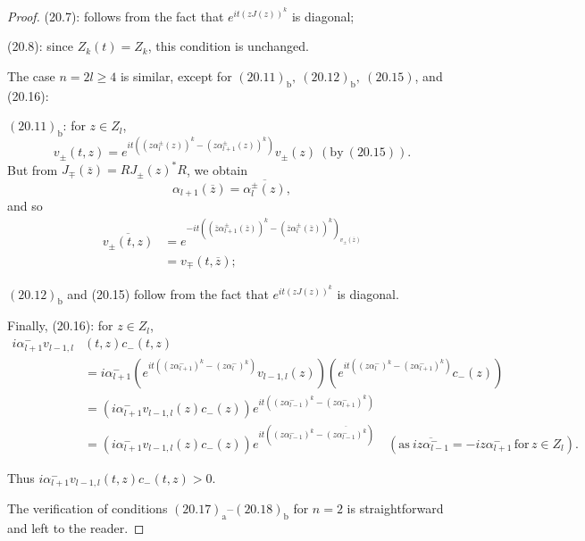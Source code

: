 \documentclass{surv-l}
\theoremstyle{plain}
\theoremstyle{definition}
\numberwithin{equation}{chapter}
\begin{document}
\begin{proof}
(20.7): follows from the fact that $e^{it(zJ(z))^{k}}$ is diagonal;

(20.8): since $Z_{k}(t)=Z_{k}$, this condition is unchanged.

The case $n=2l\geq 4$ is similar, except for $(20.11)_{\mathrm{b}},\ (20.12)_{\mathrm{b}},\ (20.15)$, and (20.16):

$(20.11)_{\mathrm{b}}$: for $z\in Z_{l}$,
\begin{equation*}
v_{\pm}(t, z)=e^{it{((z\alpha_{l}^{\pm}(z))^{k}-(z\alpha_{l+1}^{\pm}(z))^{k})}}{v_\pm}(z)\ (\mathrm{by}\ (20.15)).
\end{equation*}
But from $J_{\mp}(\overline{z})=RJ_{\pm}(z)^{*}R$, we obtain
\begin{equation*}
\alpha_{l+1}(\overline{z})=\overline{\alpha_{l}^{\pm}(z)},
\end{equation*}
and so
\begin{align*}
\overline{v_{\pm}(t,z)}&=e^{-it(({\overline{z}\alpha}_{l+1}^{\pm}(\overline{z}))^{k}-({\overline{z}\alpha}_{l}^{\pm}
(\overline{z}))^{k})_{v_{\pm}(\overline{z})}}\\
&=v_{\mp}(t,\overline{z});
\end{align*}

$(20.12)_{\mathrm{b}}$ and (20.15) follow from the fact that $e^{it(zJ(z))^{k}}$ is diagonal.

Finally, (20.16): for $z\in Z_{l}$,
\begin{align*}
i\alpha_{l+1}^{-}v_{l-1,l}&(t, z)c_{-}(t, z)\\
&=i\alpha_{l+1}^{-}(e^{it((z\alpha_{l+1}^{-})^{k}-(z\alpha_{l}^{-})^{k})}v_{l-1,l}(z))(e^{it((z\alpha_{l}^{-})^{k}-(z\alpha_{l+1}^{-})^{k})}{c_{-}(z)})\\
&=(i\alpha_{l+1}^{-}v_{l-1,l}(z)c_{-}(z))e^{it( (z\alpha_{l-1}^{-})^{k}-(z\alpha_{l+1}^{-})^{k})}\\
&=(i\alpha_{l+1}^{-}v_{l-1,l}(z)c_{-}(z))e^{it((z\alpha_{l-1}^{-})^{k}-\overline{(z\alpha_{l-1}^{-})^{k}})}\quad(\mathrm{as}\ \overline{iz\alpha_{l-1}^{-}}=-iz\alpha_{l+1}^{-}\, \mathrm{for}\, z\in Z_{l}).
\end{align*}

Thus $i\alpha_{l+1}^{-}v_{l-1,l}(t, z)c_{-}(t, z)>0$.

The verification of conditions $(20.17)_{\mathrm{a}}$--$(20.18)_{\mathrm{b}}$ for $n=2$ is straightforward and left to the reader.


\end{proof}
\end{document}
